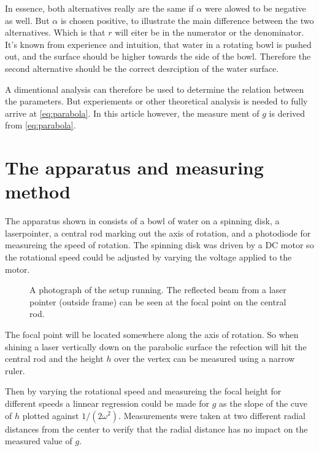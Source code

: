 \documentclass[11pt,towcolumn, swedish, english]{article}
\begin{document}
In essence, both alternatives really are
the same if $\alpha$ were alowed to be negative as well. But $\alpha$ is
chosen positive, to illustrate the main difference between the two
alternatives. Which is that $r$ will eiter be in the numerator or the
denominator. It's known from experience and intuition, 
that water in a rotating bowl is pushed out, and the surface should be
higher towards the side of the bowl. Therefore the second alternative
should be the correct desrciption of the water surface. 

A dimentional analysis can therefore be used to determine the relation
between the parameters. But experiements or other theoretical analysis
is needed to fully arrive at \eqref{eq:parabola}. In this article
however, the measure ment of $g$ is derived from \eqref{eq:parabola}. 



\section{The apparatus and measuring method}
The apparatus shown in  consists of a bowl of water
on a spinning disk, a laserpointer, a central rod marking out the axis of
rotation, and a photodiode for measureing the speed of rotation. The spinning
disk was driven by a DC motor so the rotational speed could be
adjusted by varying the voltage applied to the motor. 

\begin{figure}
\centering
\resizebox{0.7\linewidth}{!}{}
\caption{A photograph of the setup running. The
  reflected beam from a laser pointer (outside frame) can be seen at
  the focal point on the central rod. } 
\label{fig:rot_bowl_pic} 
\end{figure}

The focal point will be located somewhere along the axis of rotation. So when
shining a laser vertically down on the parabolic surface the refection will hit
the central rod and the height $h$ over the vertex can be measured
using a narrow ruler. 

Then by varying the rotational speed and measureing the focal height for
different speeds a linnear regression could be made for $g$ as the
slope of the cuve of $h$ plotted against $1/(2\omega^2)$. 
Measurements were taken at two different radial distances from the
center to verify that the radial distance has no impact on the measured
value of $g$. 
\end{document}
